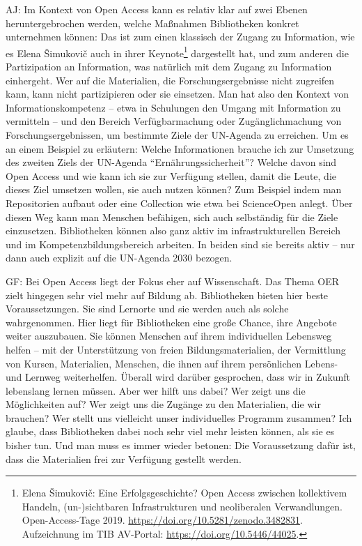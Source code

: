 \documentclass[a4paper,
fontsize=11pt,
oneside,
numbers=noperiodatend,
parskip=half-,
bibliography=totoc,
final
]{scrartcl}
\begin{document}
AJ: Im Kontext von Open Access kann es relativ klar auf zwei Ebenen
heruntergebrochen werden, welche Maßnahmen Bibliotheken konkret
unternehmen können: Das ist zum einen klassisch der Zugang zu
Information, wie es Elena Šimukovič auch in ihrer Keynote\footnote{Elena
  Šimukovič: Eine Erfolgsgeschichte? Open Access zwischen kollektivem
  Handeln, (un-)sichtbaren Infrastrukturen und neoliberalen
  Verwandlungen. Open-Access-Tage 2019.
  \url{https://doi.org/10.5281/zenodo.3482831}. Aufzeichnung im TIB
  AV-Portal: \url{https://doi.org/10.5446/44025}.} dargestellt hat, und
zum anderen die Partizipation an Information, was natürlich mit dem
Zugang zu Information einhergeht. Wer auf die Materialien, die
Forschungsergebnisse nicht zugreifen kann, kann nicht partizipieren oder
sie einsetzen. Man hat also den Kontext von Informationskompetenz --
etwa in Schulungen den Umgang mit Information zu vermitteln -- und den
Bereich Verfügbarmachung oder Zugänglichmachung von
Forschungsergebnissen, um bestimmte Ziele der UN-Agenda zu erreichen. Um
es an einem Beispiel zu erläutern: Welche Informationen brauche ich zur
Umsetzung des zweiten Ziels der UN-Agenda
\enquote{Ernährungssicherheit}? Welche davon sind Open Access und wie
kann ich sie zur Verfügung stellen, damit die Leute, die dieses Ziel
umsetzen wollen, sie auch nutzen können? Zum Beispiel indem man
Repositorien aufbaut oder eine Collection wie etwa bei ScienceOpen
anlegt. Über diesen Weg kann man Menschen befähigen, sich auch
selbständig für die Ziele einzusetzen. Bibliotheken können also ganz
aktiv im infrastrukturellen Bereich und im Kompetenzbildungsbereich
arbeiten. In beiden sind sie bereits aktiv -- nur dann auch explizit auf
die UN-Agenda 2030 bezogen.

GF: Bei Open Access liegt der Fokus eher auf Wissenschaft. Das Thema OER
zielt hingegen sehr viel mehr auf Bildung ab. Bibliotheken bieten hier
beste Voraussetzungen. Sie sind Lernorte und sie werden auch als solche
wahrgenommen. Hier liegt für Bibliotheken eine große Chance, ihre
Angebote weiter auszubauen. Sie können Menschen auf ihrem individuellen
Lebensweg helfen -- mit der Unterstützung von freien
Bildungsmaterialien, der Vermittlung von Kursen, Materialien, Menschen,
die ihnen auf ihrem persönlichen Lebens- und Lernweg weiterhelfen.
Überall wird darüber gesprochen, dass wir in Zukunft lebenslang lernen
müssen. Aber wer hilft uns dabei? Wer zeigt uns die Möglichkeiten auf?
Wer zeigt uns die Zugänge zu den Materialien, die wir brauchen? Wer
stellt uns vielleicht unser individuelles Programm zusammen? Ich glaube,
dass Bibliotheken dabei noch sehr viel mehr leisten können, als sie es
bisher tun. Und man muss es immer wieder betonen: Die Voraussetzung
dafür ist, dass die Materialien frei zur Verfügung gestellt werden.
\end{document}
